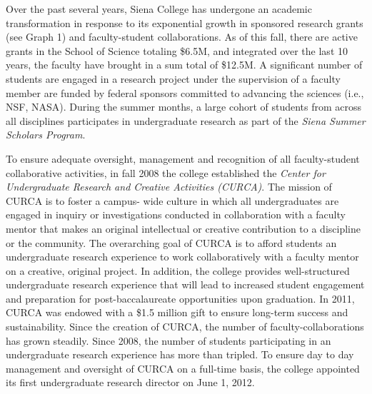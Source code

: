 \documentclass[11pt]{article}
\begin{document}
Over the past several years, Siena College has undergone an academic transformation in
response to its exponential growth in sponsored research grants (see Graph 1) and faculty-student
collaborations. 
As of this fall, there are active grants in the School of Science totaling \$6.5M,
and integrated over the last 10 years, the faculty have brought in a sum total
of \$12.5M. 
A significant number of students are engaged in a research
project under the supervision of a faculty member are funded by federal sponsors committed to
advancing the sciences (i.e., NSF, NASA). During the summer months, a large cohort of
students from across all disciplines participates in undergraduate research as part of the 
{\it Siena Summer Scholars Program}.

To ensure adequate oversight, management and recognition of all
faculty-student collaborative activities, in fall 2008 the college
established the {\it Center for Undergraduate Research and Creative
Activities (CURCA)}. The mission of CURCA is to foster a campus-
wide culture in which all undergraduates are engaged in inquiry or
investigations conducted in collaboration with a faculty mentor that
makes an original intellectual or creative contribution to a
discipline or the community. The overarching goal of CURCA is
to afford students an undergraduate research experience to work
collaboratively with a faculty mentor on a creative, original project.
In addition, the college provides well-structured undergraduate
research experience that will lead to increased student engagement
and preparation for post-baccalaureate opportunities upon
graduation. In 2011, CURCA was endowed with a \$1.5
million gift to ensure long-term success and sustainability.
Since the creation of CURCA, the number of faculty-collaborations
has grown steadily.  Since 2008, the number of students participating
in an undergraduate research experience has more than tripled. 
To ensure day to day management and
oversight of CURCA on a full-time basis, the college appointed its first undergraduate research
director on June 1, 2012.
\end{document}
